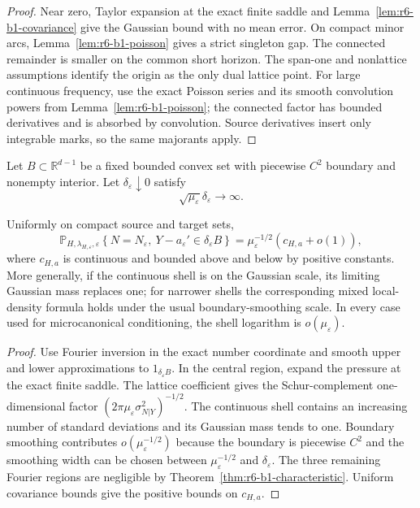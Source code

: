 \begin{proof}
Near zero, Taylor expansion at the exact finite saddle and
Lemma~\ref{lem:r6-b1-covariance} give the Gaussian bound with no mean error.
On compact minor arcs, Lemma~\ref{lem:r6-b1-poisson} gives a strict singleton
gap.  The connected remainder is smaller on the common short horizon.  The
span-one and nonlattice assumptions identify the origin as the only dual
lattice point.  For large continuous frequency, use the exact Poisson series
and its smooth convolution powers from
Lemma~\ref{lem:r6-b1-poisson}; the connected factor has bounded derivatives
and is absorbed by convolution.  Source derivatives insert only integrable
marks, so the same majorants apply.
\end{proof}

Let \(B\subset\mathbb R^{d-1}\) be a fixed bounded convex set with piecewise
\(C^2\) boundary and nonempty interior.  Let
\(\delta_\varepsilon\downarrow0\) satisfy
\[
\sqrt{\mu_\varepsilon}\delta_\varepsilon\to\infty.
\]

\begin{theorem}
\label{thm:r6-b1-coefficient}
Uniformly on compact source and target sets,
\[
\mathbb P_{H,\lambda_{H,\varepsilon},\varepsilon}
\left\{
N=N_\varepsilon,
\ Y-a_\varepsilon'
\in\delta_\varepsilon B
\right\}
=\mu_\varepsilon^{-1/2}
\left(c_{H,a}+o(1)\right),
\]
where \(c_{H,a}\) is continuous and bounded above and below by positive
constants.  More generally, if the continuous shell is on the Gaussian scale,
its limiting Gaussian mass replaces one; for narrower shells the corresponding
mixed local-density formula holds under the usual boundary-smoothing scale.
In every case used for microcanonical conditioning, the shell logarithm is
\(o(\mu_\varepsilon)\).
\end{theorem}

\begin{proof}
Use Fourier inversion in the exact number coordinate and smooth upper and
lower approximations to \(1_{\delta_\varepsilon B}\).  In the central region,
expand the pressure at the exact finite saddle.  The lattice coefficient gives
the Schur-complement one-dimensional factor
\((2\pi\mu_\varepsilon\sigma_{N|Y}^2)^{-1/2}\).  The continuous shell contains
an increasing number of standard deviations and its Gaussian mass tends to
one.  Boundary smoothing contributes
\(o(\mu_\varepsilon^{-1/2})\) because the boundary is piecewise \(C^2\) and
the smoothing width can be chosen between
\(\mu_\varepsilon^{-1/2}\) and \(\delta_\varepsilon\).  The three remaining
Fourier regions are negligible by
Theorem~\ref{thm:r6-b1-characteristic}.  Uniform covariance bounds give the
positive bounds on \(c_{H,a}\).
\end{proof}

